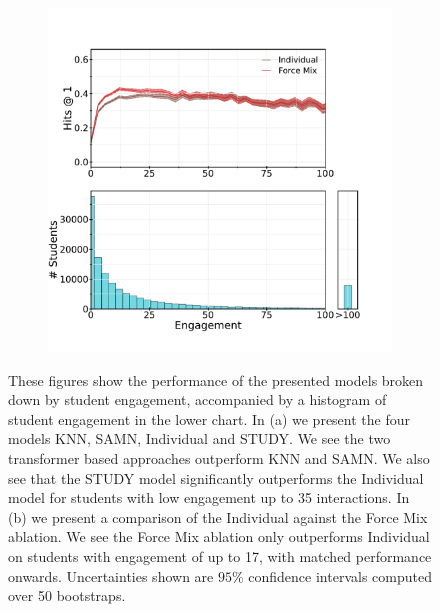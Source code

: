 \documentclass{article}
\begin{document}
\begin{figure}[]
\begin{subfigure}[]{0.4\linewidth}
        \includegraphics[width=\linewidth]{figures/force_mix.pdf}
    \caption{}
    \end{subfigure}
    \caption{These figures show the performance of the presented models broken down by student engagement, accompanied by a histogram of student engagement in the lower chart. In (a) we present the four models KNN, SAMN, Individual and STUDY. We see the two transformer based approaches outperform KNN and SAMN. We also see that the STUDY model significantly outperforms the Individual model for students with low engagement up to 35 interactions. In (b) we present a comparison of the Individual against the Force Mix ablation. We see the Force Mix ablation only outperforms Individual on students with engagement of up to 17, with matched performance onwards. Uncertainties shown are $95\%$ confidence intervals computed over 50 bootstraps.}
    \label{fig:engagement}
\end{figure}
\end{document}
